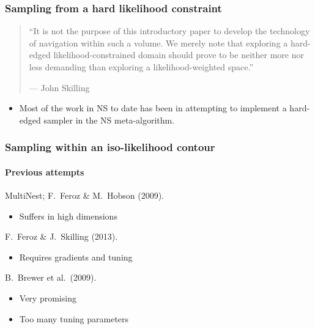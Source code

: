 \documentclass[]{beamer}
\begin{document}
\begin{frame}
  \frametitle{Sampling from a hard likelihood constraint} 

  \pause
  \begin{quote}
    ``It is not the purpose of this introductory paper to develop the technology of navigation within such a volume. We merely note that exploring a hard-edged likelihood-constrained domain should prove to be neither more nor less demanding than exploring a likelihood-weighted space.''
    
   {\hfill --- John Skilling}
  \end{quote}

  \begin{itemize}
      \pause
    \item Most of the work in NS to date has been in attempting to implement a hard-edged sampler in the NS meta-algorithm.
  \end{itemize}
 
\end{frame}


\begin{frame}
  \frametitle{Sampling within an iso-likelihood contour}
  \framesubtitle{Previous attempts}


  \begin{description}
    \pause\item[Rejection Sampling] MultiNest; F.\ Feroz \& M.\ Hobson (2009).
      \begin{itemize}
        \pause\item Suffers in high dimensions
      \end{itemize}
    \pause\item[Hamiltonian sampling] F.\ Feroz \& J.\ Skilling (2013).
      \begin{itemize}
        \pause\item Requires gradients and tuning
      \end{itemize}
    \pause\item[Diffusion Nested Sampling] B.\ Brewer et al.\ (2009).
      \begin{itemize}
        \pause\item Very promising
        \pause\item Too many tuning parameters
      \end{itemize}
  \end{description}

\end{frame}
\end{document}
